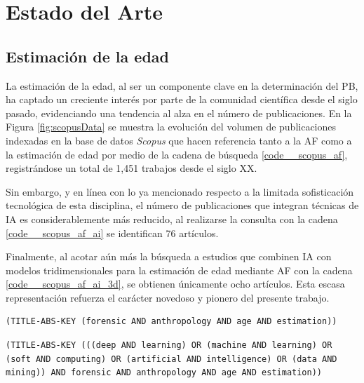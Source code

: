 \chapter{Estado del Arte}

\section{Estimación de la edad}
La estimación de la edad, al ser un componente clave en la determinación del PB, ha captado un creciente interés por parte de la comunidad científica desde el siglo pasado, evidenciando una tendencia al alza en el número de publicaciones. En la Figura \ref{fig:scopusData} se muestra la evolución del volumen de publicaciones indexadas en la base de datos \textit{Scopus} que hacen referencia tanto a la AF como a la estimación de edad por medio de la cadena de búsqueda \ref{code__scopus_af}, registrándose un total de 1,451 trabajos desde el siglo XX.

Sin embargo, y en línea con lo ya mencionado respecto a la limitada sofisticación tecnológica de esta disciplina, el número de publicaciones que integran técnicas de IA es considerablemente más reducido, al realizarse la consulta con la cadena \ref{code__scopus_af_ai} se identifican 76 artículos.

Finalmente, al acotar aún más la búsqueda a estudios que combinen IA con modelos tridimensionales para la estimación de edad mediante AF con la cadena \ref{code__scopus_af_ai_3d}, se obtienen únicamente ocho artículos. Esta escasa representación refuerza el carácter novedoso y pionero del presente trabajo.

\begin{lstlisting}[caption={Cadena de búsqueda de \textit{Scopus} para obtener publicaciones de AF que referencian la estimación de la edad.}, captionpos=b, label=code__scopus_af, style=Consola]
(TITLE-ABS-KEY (forensic AND anthropology AND age AND estimation))
\end{lstlisting}
            
\begin{lstlisting}[caption={Cadena de búsqueda de \textit{Scopus} para obtener publicaciones de AF que referencian la estimación de la edad y hacen uso de alguna técnica de IA}, captionpos=b, label=code__scopus_af_ai, style=Consola]
(TITLE-ABS-KEY (((deep AND learning) OR (machine AND learning) OR (soft AND computing) OR (artificial AND intelligence) OR (data AND mining)) AND forensic AND anthropology AND age AND estimation))
\end{lstlisting}
            

